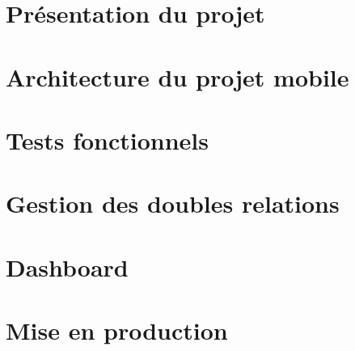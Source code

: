 
\section{Présentation du projet}
\label{prezAppNeuflize}
	
	
\section{Architecture du projet mobile}
	
	
\section{Tests fonctionnels}
	
	
\section{Gestion des doubles relations}
	
	
\section{Dashboard}
	

\section{Mise en production}
	